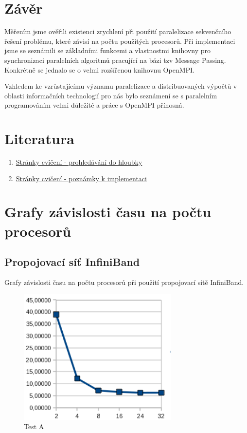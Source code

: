 \documentclass[12pt]{article}
\begin{document}
\section{Závěr}
Měřením jsme ověřili existenci zrychlení při použití paralelizace sekvenčního řešení problému, které
závisí na počtu použitých procesorů.
Při implementaci jsme se seznámili se základními funkcemi a vlastnostmi knihovny pro synchronizaci paralelních algoritmů
pracující na bázi tzv Message Passing. Konkrétně se jednalo se o velmi rozšířenou knihovnu OpenMPI.

Vzhledem ke vzrůstajícímu významu paralelizace a distribuovaných výpočtů v oblasti informačních technologií
pro nás bylo seznámení se s paralelním programováním velmi důležité a práce s OpenMPI přínosná.
\section{Literatura}
\begin{enumerate}
\item \href{https://edux.fit.cvut.cz/courses/MI-PAR/labs/prohledavani_do_hloubky}{Stránky cvičení - prohledávání do hloubky}
\item \href{https://edux.fit.cvut.cz/courses/MI-PAR/labs/poznamky_k_implementaci}{Stránky cvičení - poznámky k implementaci}
\end{enumerate}


\appendix
\section{Grafy závislosti času na počtu procesorů}
\subsection{Propojovací síť InfiniBand}
Grafy závislosti času na počtu procesorů při použití propojovací sítě InfiniBand.
\begin{figure}[H]
\begin{center}
\includegraphics[width=8cm]{grafy-zprava/testAinfib.png}
\caption{Test A}
\label{fig:testAinfib}
\end{center}
\end{figure}
\end{document}

